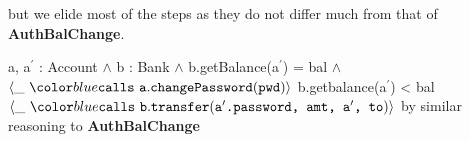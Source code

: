 but we elide most of the steps as they do not differ much from that of \textbf{AuthBalChange}.\\
{
	\begin{proofexample}
			{\proofstepwithrule
				{\onlyIfSingleEx
						{a, a$^\prime$ : Account $\wedge$ b : Bank $\wedge$ b.getBalance(a$^\prime$) = bal $\wedge$ $\calls{\_}{\prg{a}}{\prg{changePassword}}{\prg{pwd}}$}
						{b.getbalance(a$^\prime$) < bal}
						{$\calls{\_}{\prg{b}}{\prg{transfer}}{\prg{a$^\prime$.password, amt, a$^\prime$, to}}$}
						}
					{by similar reasoning to \textbf{AuthBalChange}}
			}
		\endproofsteps
	\end{proofexample}
}
